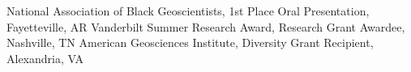 %
%
%


\begin{scholarship}
					 {National Association of Black Geoscientists, 1st Place Oral Presentation, Fayetteville, AR}
					 {Vanderbilt Summer Research Award, Research Grant Awardee, Nashville, TN}
					 {American Geosciences Institute, Diversity Grant Recipient, Alexandria, VA}
\end{scholarship}